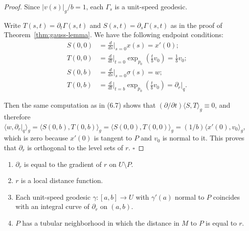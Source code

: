 \begin{proof}
Since $|v(s)|_g / b = 1$, each $\Gamma_s$ is a unit-speed geodesic.

Write $T(s,t) = \partial_t \Gamma(s,t)$ and $S(s,t) = \partial_s \Gamma(s,t)$ as in the proof of Theorem~\ref{thm:gauss-lemma}. We have the following endpoint conditions:
\begin{align*}
S(0, 0) &= \frac{d}{ds}\bigg|_{s=0} x(s) = x'(0); \\
T(0, 0) &= \frac{d}{dt}\bigg|_{t=0} \exp_{p_0}\left(\frac{t}{b}v_0\right) = \frac{1}{b}v_0; \\
S(0, b) &= \frac{d}{ds}\bigg|_{s=0} \sigma(s) = w; \\
T(0, b) &= \frac{d}{dt}\bigg|_{t=b} \exp_{p_0}\left(\frac{t}{b}v_0\right) = \partial_r\big|_q.
\end{align*}

Then the same computation as in (6.7) shows that $(\partial/\partial t)\langle S, T \rangle_g \equiv 0$, and therefore $\langle w, \partial_r|_q \rangle_g = \langle S(0,b), T(0,b) \rangle_g = \langle S(0,0), T(0,0) \rangle_g = (1/b)\langle x'(0), v_0 \rangle_g$, which is zero because $x'(0)$ is tangent to $P$ and $v_0$ is normal to it. This proves that $\partial_r$ is orthogonal to the level sets of $r$. $\square$
\end{proof}

\begin{corollary}
\label{cor:distance-function-local-properties}

\begin{enumerate}
\item[(a)] $\partial_r$ is equal to the gradient of $r$ on $U \setminus P$.
\item[(b)] $r$ is a local distance function.
\item[(c)] Each unit-speed geodesic $\gamma : [a, b] \to U$ with $\gamma'(a)$ normal to $P$ coincides with an integral curve of $\partial_r$ on $(a,b)$.
\item[(d)] $P$ has a tubular neighborhood in which the distance in $M$ to $P$ is equal to $r$.
\end{enumerate}
\end{corollary}

